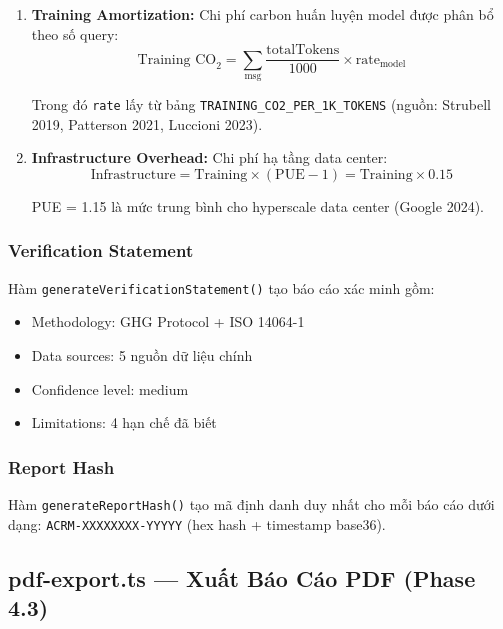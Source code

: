 \documentclass[12pt,a4paper]{article}
\begin{document}
\begin{enumerate}
    \item \textbf{Training Amortization:} Chi phí carbon huấn luyện model được phân bổ theo số query:
    \begin{equation}
        \text{Training CO}_2 = \sum_{\text{msg}} \frac{\text{totalTokens}}{1000} \times \text{rate}_{\text{model}}
    \end{equation}

    Trong đó \texttt{rate} lấy từ bảng \texttt{TRAINING\_CO2\_PER\_1K\_TOKENS} (nguồn: Strubell 2019, Patterson 2021, Luccioni 2023).

    \item \textbf{Infrastructure Overhead:} Chi phí hạ tầng data center:
    \begin{equation}
        \text{Infrastructure} = \text{Training} \times (\text{PUE} - 1) = \text{Training} \times 0.15
    \end{equation}

    PUE = 1.15 là mức trung bình cho hyperscale data center (Google 2024).
\end{enumerate}

\subsubsection{Verification Statement}

Hàm \texttt{generateVerificationStatement()} tạo báo cáo xác minh gồm:
\begin{itemize}
    \item Methodology: GHG Protocol + ISO 14064-1
    \item Data sources: 5 nguồn dữ liệu chính
    \item Confidence level: medium
    \item Limitations: 4 hạn chế đã biết
\end{itemize}

\subsubsection{Report Hash}

Hàm \texttt{generateReportHash()} tạo mã định danh duy nhất cho mỗi báo cáo dưới dạng: \texttt{ACRM-XXXXXXXX-YYYYY} (hex hash + timestamp base36).

\subsection{pdf-export.ts — Xuất Báo Cáo PDF (Phase 4.3)}
\end{document}
